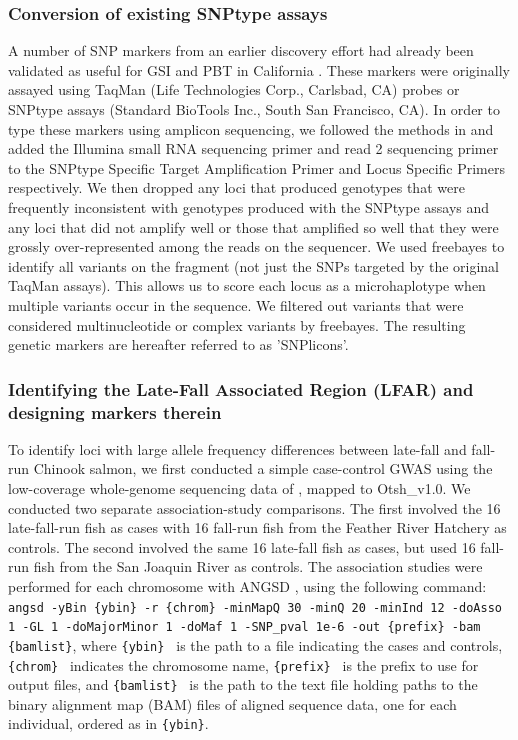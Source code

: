 \subsubsection*{Conversion of existing SNPtype assays}

A number of SNP markers from an earlier discovery effort \citep{clemento2011discovery} had already
been validated as useful for GSI
and PBT in California \citep{clemento2014evaluation}. These markers were originally assayed
using TaqMan (Life Technologies Corp., Carlsbad, CA) probes or SNPtype assays (Standard BioTools Inc., South San Francisco, CA).
In order to type these markers using amplicon sequencing, we followed the methods in
\citet{campbell2015genotyping} and added the Illumina small RNA sequencing primer and
read 2 sequencing primer to the SNPtype Specific Target Amplification Primer and Locus
Specific Primers respectively.  We then dropped any loci that produced genotypes that were
frequently inconsistent with genotypes produced with the SNPtype assays and any loci that
did not amplify well or those that amplified so well that they were grossly over-represented
among the reads on the sequencer.  We
used freebayes \citep{garrison2012haplotype} to identify all variants on the fragment (not just the SNPs targeted by the original TaqMan assays).  This allows us to score each locus as a
microhaplotype \citep{baetscher2018microhaplotypes} when multiple variants occur in the sequence.  We filtered out variants
that were considered multinucleotide or complex variants by freebayes. The resulting genetic markers are hereafter referred to as 'SNPlicons'.


\subsubsection*{Identifying the Late-Fall Associated Region (LFAR) and designing markers therein}

To identify loci with large allele frequency differences between late-fall and fall-run Chinook salmon,
we first conducted a simple case-control GWAS using the low-coverage whole-genome sequencing
data of \citet{thompson2020complex}, mapped to Otsh\_v1.0.  We conducted
two separate association-study comparisons.
The first involved the 16 late-fall-run fish as cases with 16 fall-run fish from the Feather River Hatchery as controls.
The second involved the same 16 late-fall fish as cases, but used 16 fall-run fish from the San
Joaquin River as controls.  The association studies were performed for each chromosome with
ANGSD \citep{pmid21663684,korneliussen_angsd_2014}, using the following command: {\footnotesize\tt angsd -yBin \{ybin\}  -r \{chrom\}
-minMapQ 30 -minQ 20 -minInd 12 -doAsso 1 -GL 1 -doMajorMinor 1 -doMaf 1 -SNP\_pval 1e-6
-out \{prefix\}  -bam \{bamlist\}}, where {\tt \{ybin\} } is the path to a file indicating the cases and
controls,
{\tt \{chrom\} } indicates the chromosome name, {\tt \{prefix\} } is the prefix to use for output files, and
{\tt \{bamlist\} } is the path to the text file holding paths to the binary alignment map (BAM) files
of aligned sequence data, one for each individual, ordered as in {\tt \{ybin\}}.

